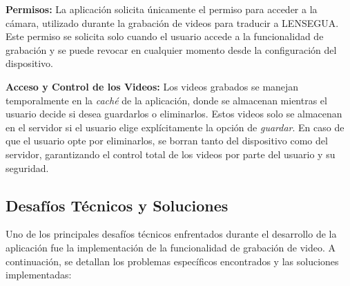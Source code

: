 \textbf{Permisos:} La aplicación solicita únicamente el permiso para acceder a la cámara, utilizado durante la grabación de videos para traducir a LENSEGUA. Este permiso se solicita solo cuando el usuario accede a la funcionalidad de grabación y se puede revocar en cualquier momento desde la configuración del dispositivo.

\textbf{Acceso y Control de los Videos:} Los videos grabados se manejan temporalmente en la \textit{caché} de la aplicación, donde se almacenan mientras el usuario decide si desea guardarlos o eliminarlos. Estos videos solo se almacenan en el servidor si el usuario elige explícitamente la opción de \textit{guardar}. En caso de que el usuario opte por eliminarlos, se borran tanto del dispositivo como del servidor, garantizando el control total de los videos por parte del usuario y su seguridad.


\subsection{Desafíos Técnicos y Soluciones}

Uno de los principales desafíos técnicos enfrentados durante el desarrollo de la aplicación fue la implementación de la funcionalidad de grabación de video. A continuación, se detallan los problemas específicos encontrados y las soluciones implementadas:

